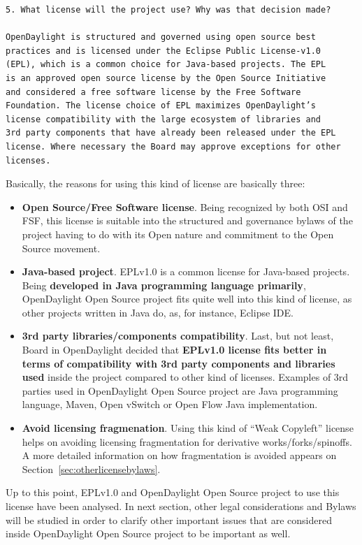 \documentclass[a4paper, 12pt]{book}
\begin{document}
\begin{verbatim}
5. What license will the project use? Why was that decision made?

OpenDaylight is structured and governed using open source best
practices and is licensed under the Eclipse Public License-v1.0
(EPL), which is a common choice for Java-based projects. The EPL
is an approved open source license by the Open Source Initiative
and considered a free software license by the Free Software
Foundation. The license choice of EPL maximizes OpenDaylight’s
license compatibility with the large ecosystem of libraries and
3rd party components that have already been released under the EPL
license. Where necessary the Board may approve exceptions for other
licenses.
\end{verbatim}
Basically, the reasons for using this kind of license are basically three:
\begin{itemize}
 \item{\textbf{Open Source/Free Software license}}. Being recognized by both OSI and FSF, this license is suitable into the structured and governance bylaws of the project having to do with its Open nature and commitment to the Open Source movement.
 \item{\textbf{Java-based project}}. EPLv1.0 is a common license for Java-based projects. Being \textbf{developed in Java programming language primarily}, OpenDaylight Open Source project fits quite well into this kind of license, as other projects written in Java do, as, for instance, Eclipse IDE.
 \item{\textbf{3rd party libraries/components compatibility}}. Last, but not least, Board in OpenDaylight decided that \textbf{EPLv1.0 license fits better in terms of compatibility with 3rd party components and libraries used} inside the project compared to other kind of licenses. Examples of 3rd parties used in OpenDaylight Open Source project are Java programming language, Maven, Open vSwitch or Open Flow Java implementation.
 \item{\textbf{Avoid licensing fragmenation}}. Using this kind of ``Weak Copyleft'' license helps on avoiding licensing fragmentation for derivative works/forks/spinoffs. A more detailed information on how fragmentation is avoided appears on Section~\ref{sec:otherlicensebylaws}.
\end{itemize}
Up to this point, EPLv1.0 and OpenDaylight Open Source project to use this license have been analysed. In next section, other legal considerations and Bylaws will be studied in order to clarify other important issues that are considered inside OpenDaylight Open Source project to be important as well.
\end{document}
